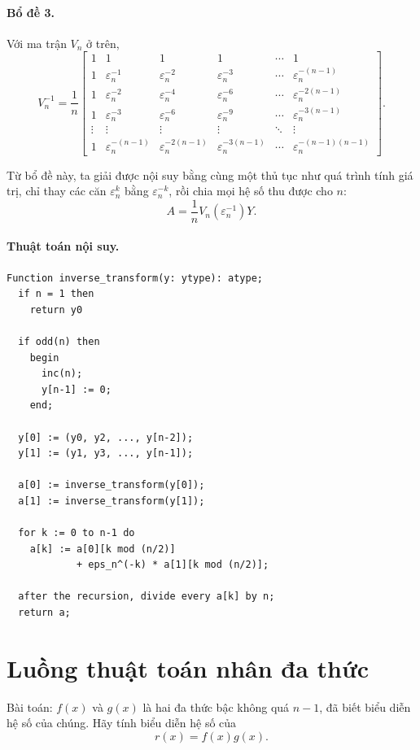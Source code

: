 \documentclass[11pt]{article}
\newcommand{\eps}{\varepsilon}
\begin{document}
\paragraph{Bổ đề 3.}
Với ma trận \(V_n\) ở trên,
\[
V_n^{-1}=\frac1n
\begin{bmatrix}
1 & 1 & 1 & 1 & \cdots & 1\\
1 & \eps_n^{-1} & \eps_n^{-2} & \eps_n^{-3}
  & \cdots & \eps_n^{-(n-1)}\\
1 & \eps_n^{-2} & \eps_n^{-4} & \eps_n^{-6}
  & \cdots & \eps_n^{-2(n-1)}\\
1 & \eps_n^{-3} & \eps_n^{-6} & \eps_n^{-9}
  & \cdots & \eps_n^{-3(n-1)}\\
\vdots & \vdots & \vdots & \vdots & \ddots & \vdots\\
1 & \eps_n^{-(n-1)} & \eps_n^{-2(n-1)}
  & \eps_n^{-3(n-1)} & \cdots & \eps_n^{-(n-1)(n-1)}
\end{bmatrix}.
\]

Từ bổ đề này, ta giải được nội suy bằng cùng một thủ tục như quá trình tính
giá trị, chỉ thay các căn \(\eps_n^k\) bằng \(\eps_n^{-k}\), rồi chia mọi hệ
số thu được cho \(n\):
\[
  A=\frac1n V_n(\eps_n^{-1})Y.
\]

\paragraph{Thuật toán nội suy.}
\begin{verbatim}
Function inverse_transform(y: ytype): atype;
  if n = 1 then
    return y0

  if odd(n) then
    begin
      inc(n);
      y[n-1] := 0;
    end;

  y[0] := (y0, y2, ..., y[n-2]);
  y[1] := (y1, y3, ..., y[n-1]);

  a[0] := inverse_transform(y[0]);
  a[1] := inverse_transform(y[1]);

  for k := 0 to n-1 do
    a[k] := a[0][k mod (n/2)]
            + eps_n^(-k) * a[1][k mod (n/2)];

  after the recursion, divide every a[k] by n;
  return a;
\end{verbatim}

\section{Luồng thuật toán nhân đa thức}

Bài toán: \(f(x)\) và \(g(x)\) là hai đa thức bậc không quá \(n-1\), đã biết
biểu diễn hệ số của chúng. Hãy tính biểu diễn hệ số của
\[
  r(x)=f(x)g(x).
\]
\end{document}
